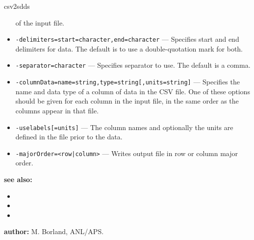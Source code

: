 \begin{sddsprog}{csv2sdds}
\begin{itemize}
        of the input file.
      \item \verb|-delimiters=start=character,end=character| --- Specifies start and end
        delimiters for data. The default is to use a double-quotation mark for both.
      \item \verb|-separator=character| --- Specifies separator to use. The default is a comma.
      \item \verb|-columnData=name=string,type=string[,units=string]| ---
        Specifies the name and data
        type of a column of data in the CSV file. One of these options should be given for each
        column in the input file, in the same order as the columns appear in that file.
      \item \verb|-uselabels[=units]| --- The column names and optionally the units are defined in the
        file prior to the data.
      \item \verb!-majorOrder=<row|column>! --- Writes output file in row or column major order.
    \end{itemize}
  \item \textbf{see also:}
    \begin{itemize}
      \item {}
      \item {}
      \item {}
    \end{itemize}
  \item \textbf{author:} M. Borland, ANL/APS.
\end{sddsprog}

